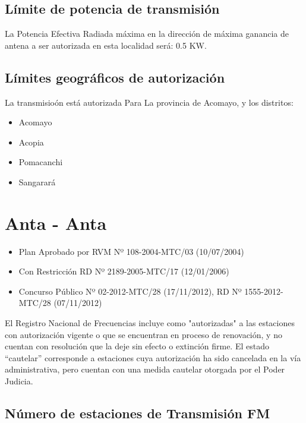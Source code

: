 \documentclass[a4paper]{IEEEtran} %
\begin{document}
\subsection{Límite de potencia de transmisión}

La Potencia Efectiva Radiada máxima en la dirección de máxima ganancia de antena a ser autorizada en esta localidad será: 0.5 KW.

\subsection{Límites geográficos de autorización}

La transmisioón está autorizada Para La provincia de Acomayo, y los distritos:

\begin{itemize}
	\item Acomayo 
	\item Acopia 
	\item Pomacanchi 
	\item Sangarará
\end{itemize}



\section{Anta - Anta}

\begin{itemize}
	\item Plan Aprobado por RVM Nº 108-2004-MTC/03 (10/07/2004)
	\item Con Restricción RD Nº 2189-2005-MTC/17 (12/01/2006)
	\item Concurso Público Nº 02-2012-MTC/28 (17/11/2012), RD Nº 1555-2012-MTC/28 (07/11/2012)
\end{itemize}

El Registro Nacional de Frecuencias incluye como "autorizadas" a las estaciones con autorización vigente o que se encuentran en proceso de renovación, y no cuentan con resolución que la deje sin efecto o extinción firme. El estado “cautelar” corresponde a estaciones cuya autorización ha sido cancelada en la vía administrativa, pero cuentan con una medida cautelar otorgada por el Poder Judicia.

\subsection{Número de estaciones de Transmisión FM}
\end{document}
